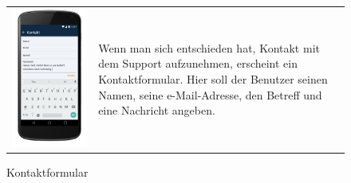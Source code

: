 \begin{figure}[h]
\begin{tabularx}{\textwidth}{X  X}
	\includegraphics[scale = 0.155]{img/AndroidMockup/contact} \caption{Kontaktformular} & Wenn man sich entschieden hat, Kontakt mit dem Support aufzunehmen, erscheint ein Kontaktformular. Hier soll der Benutzer seinen Namen, seine e-Mail-Adresse, den Betreff und eine Nachricht angeben. \\ 
\end{tabularx}
\end{figure} 


